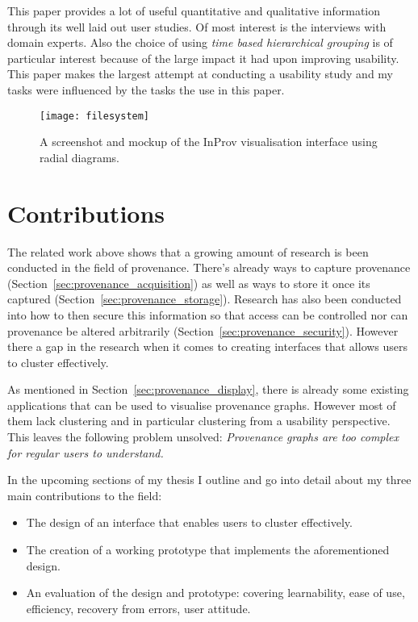 This paper provides a lot of useful quantitative and qualitative information through its well laid out user studies. Of most interest is the interviews with domain experts. Also the choice of using \textit{time based hierarchical grouping} is of particular interest because of the large impact it had upon improving usability. This paper makes the largest attempt at conducting a usability study and my tasks were influenced by the tasks the use in this paper.

\begin{figure}[h]
	\centering
	\texttt{[image: filesystem]}
	\caption{A screenshot and mockup of the InProv visualisation interface using radial diagrams.}
	\label{fig:filesystem}
\end{figure}

\section{Contributions}

The related work above shows that a growing amount of research is been conducted in the field of provenance. There's already ways to capture provenance (Section~\ref{sec:provenance_acquisition}) as well as ways to store it once its captured (Section~\ref{sec:provenance_storage}). Research has also been conducted into how to then secure this information so that access can be controlled nor can provenance be altered arbitrarily (Section~\ref{sec:provenance_security}). However there a gap in the research when it comes to creating interfaces that allows users to cluster effectively.

As mentioned in Section~\ref{sec:provenance_display}, there is already some existing applications that can be used to visualise provenance graphs. However most of them lack clustering and in particular clustering from a usability perspective. This leaves the following problem unsolved: \textit{Provenance graphs are too complex for regular users to understand.} 

In the upcoming sections of my thesis I outline and go into detail about my three main contributions to the field:

\begin{itemize}
	\item The design of an interface that enables users to cluster effectively.
	\item The creation of a working prototype that implements the aforementioned design.
	\item An evaluation of the design and prototype: covering learnability, ease of use, efficiency, recovery from errors, user attitude.
\end{itemize}
